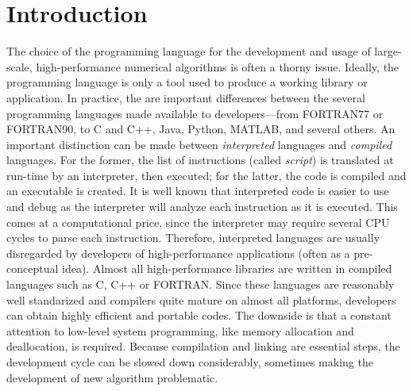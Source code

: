 \documentclass[10pt,relax]{SANDreport}
\begin{document}
\section{Introduction}
\label{sec:intro}

The choice of the programming language for the development and usage of
large-scale, high-performance numerical algorithms is often a thorny issue.
Ideally, the programming language is only a tool used to produce a working
library or application. In practice, the are important differences between the
several programming languages made available to developers---from FORTRAN77 or
FORTRAN90, to C and C++, Java, Python, MATLAB, and several others. An important
distinction can be made between {\sl interpreted} languages and {\sl compiled}
languages. For the former, the list of instructions (called {\sl script}) is
translated at run-time by an interpreter, then executed; for the latter, the
code is compiled and an executable is created. It is well known that
interpreted code is easier to use and debug as the interpreter will analyze each
instruction as it is executed. This comes at a computational price, since the interpreter
may require several CPU cycles to parse each instruction. Therefore,
interpreted languages are usually disregarded by developers of
high-performance applications (often as a pre-conceptual idea). Almost all
high-performance libraries are written in compiled languages such as C, C++ or
FORTRAN. Since these languages are reasonably well standarized and compilers
quite mature on almost all platforms, developers can obtain highly efficient
and portable codes.  The downside is that a constant attention to low-level
system programming, like memory allocation and deallocation, is required.
Because compilation and linking are essential steps, the development cycle can
be slowed down considerably, sometimes making the development of new algorithm
problematic.
\end{document}
